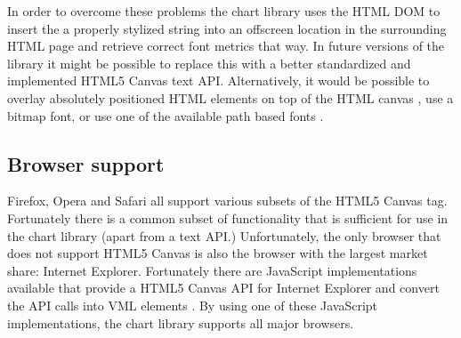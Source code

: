 In order to overcome these problems the chart library uses the HTML DOM to insert the a properly stylized string into an offscreen location in the surrounding HTML page and retrieve correct font metrics that way. In future versions of the library it might be possible to replace this with a better standardized and implemented HTML5 Canvas text API. Alternatively, it would be possible to overlay absolutely positioned HTML elements on top of the HTML canvas \cite{steele06}, use a bitmap font, or use one of the available path based fonts \cite{studt07, effenberger08, greenpoint08}.

\subsection{Browser support}
Firefox, Opera and Safari all support various subsets of the HTML5 Canvas tag. Fortunately there is a common subset of functionality that is sufficient for use in the chart library (apart from a text API.) Unfortunately, the only browser that does not support HTML5 Canvas is also the browser with the largest market share: Internet Explorer. Fortunately there are JavaScript implementations available that provide a HTML5 Canvas API for Internet Explorer and convert the API calls into VML elements \cite{google08}. By using one of these JavaScript implementations, the chart library supports all major browsers.
